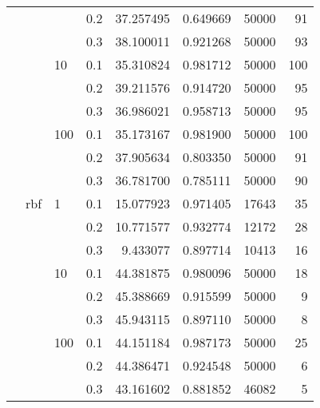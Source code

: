\begin{table}[H]
\begin{tabular}{llllrrrr}
           &     &     & 0.2 &  37.257495 &  0.649669 &   50000 &    91 \\
           &     &     & 0.3 &  38.100011 &  0.921268 &   50000 &    93 \\
           &     & 10  & 0.1 &  35.310824 &  0.981712 &   50000 &   100 \\
           &     &     & 0.2 &  39.211576 &  0.914720 &   50000 &    95 \\
           &     &     & 0.3 &  36.986021 &  0.958713 &   50000 &    95 \\
           &     & 100 & 0.1 &  35.173167 &  0.981900 &   50000 &   100 \\
           &     &     & 0.2 &  37.905634 &  0.803350 &   50000 &    91 \\
           &     &     & 0.3 &  36.781700 &  0.785111 &   50000 &    90 \\
           & rbf & 1   & 0.1 &  15.077923 &  0.971405 &   17643 &    35 \\
           &     &     & 0.2 &  10.771577 &  0.932774 &   12172 &    28 \\
           &     &     & 0.3 &   9.433077 &  0.897714 &   10413 &    16 \\
           &     & 10  & 0.1 &  44.381875 &  0.980096 &   50000 &    18 \\
           &     &     & 0.2 &  45.388669 &  0.915599 &   50000 &     9 \\
           &     &     & 0.3 &  45.943115 &  0.897110 &   50000 &     8 \\
           &     & 100 & 0.1 &  44.151184 &  0.987173 &   50000 &    25 \\
           &     &     & 0.2 &  44.386471 &  0.924548 &   50000 &     6 \\
           &     &     & 0.3 &  43.161602 &  0.881852 &   46082 &     5 \\
\bottomrule
\end{tabular}
\end{table}

